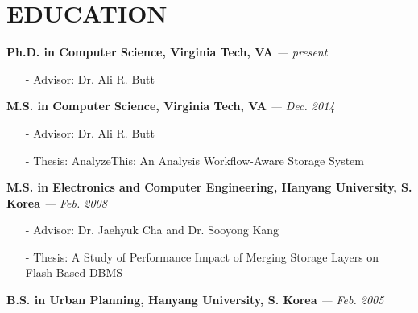 \section{EDUCATION}
\vspace{0.03in} 
{\bf Ph.D. in Computer Science, Virginia Tech, VA}
{\footnotesize{\it --- present}}
\begin{itemize}[leftmargin=*]
\setlength\itemsep{-0.02in}
  \item[-] {\small Advisor: Dr. Ali R. Butt}
\end{itemize}
\vspace{-0.15in}
{\bf M.S. in Computer Science, Virginia Tech, VA}
{\footnotesize{\it --- Dec. 2014}}
\begin{itemize}[leftmargin=*]
\setlength\itemsep{-0.02in}
  \item[-] {\small Advisor: Dr. Ali R. Butt}
  \item[-] {\small Thesis: AnalyzeThis: An Analysis Workflow-Aware Storage System}
\end{itemize}
\vspace{-0.15in}
{\bf M.S. in Electronics and Computer Engineering, Hanyang University, S. Korea}
{\footnotesize{\it --- Feb. 2008}}
\begin{itemize}[leftmargin=*]
\setlength\itemsep{-0.02in}
  \item[-] {\small Advisor: Dr. Jaehyuk Cha and Dr. Sooyong Kang}
  \item[-] {\small Thesis: A Study of Performance Impact of Merging Storage Layers on
  Flash-Based DBMS}
\end{itemize}
\vspace{-0.15in}
{\bf B.S. in Urban Planning, Hanyang University, S. Korea}
{\footnotesize{\it --- Feb. 2005}}

